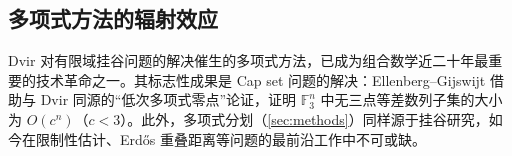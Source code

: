 \subsection{多项式方法的辐射效应}

Dvir 对有限域挂谷问题的解决\cite{dvir2009}催生的多项式方法，已成为组合数学近二十年最重要的技术革命之一。其标志性成果是 Cap set 问题的解决：Ellenberg--Gijswijt 借助与 Dvir 同源的“低次多项式零点”论证，证明 $\mathbb{F}_3^n$ 中无三点等差数列子集的大小为 $O(c^n)$（$c < 3$）\cite{ellenberggijswijt2017}。此外，多项式分划（\cref{sec:methods}）同样源于挂谷研究，如今在限制性估计、Erd\H{o}s 重叠距离等问题的最前沿工作中不可或缺。
